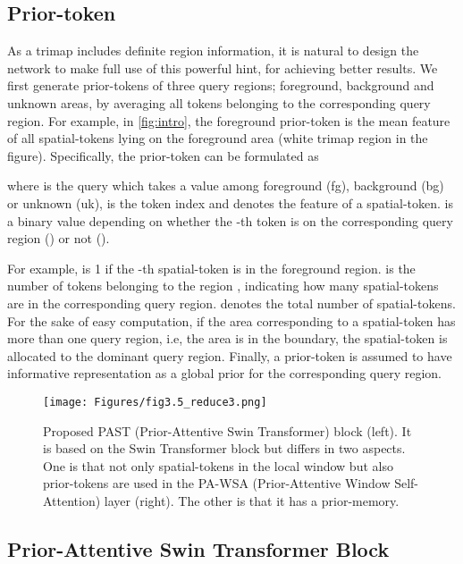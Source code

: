 \documentclass[10pt,twocolumn,letterpaper]{article}
\begin{document}
\subsection{Prior-token}
\label{sec:prior-token}
As a trimap includes definite region information, it is natural to design the network to make full use of this powerful hint, for achieving better results. We first generate prior-tokens of three query regions; foreground, background and unknown areas, by averaging all tokens belonging to the corresponding query region. For example, in \cref{fig:intro}, the foreground prior-token is the mean feature of all spatial-tokens lying on the foreground area (white trimap region in the figure).
Specifically, the prior-token  can be formulated as


where  is the query which takes a value among foreground (fg), background (bg) or unknown (uk),  is the token index and  denotes the feature of a spatial-token.  is a binary value depending on whether the -th token is on the corresponding query region () or not (). 

For example,  is 1 if the -th spatial-token is in the foreground region.  is the number of tokens belonging to the region , indicating how many spatial-tokens are in the corresponding query region.  denotes the total number of spatial-tokens.
For the sake of easy computation, if the area corresponding to a spatial-token has more than one query region, i.e, the area is in the boundary, the spatial-token is allocated to the dominant query region.
Finally, a prior-token  is assumed to have informative representation as a global prior for the corresponding query region.

\begin{figure}[t]
  \begin{center}
  \texttt{[image: Figures/fig3.5\_reduce3.png]}      
  \end{center}
  \vspace{-5mm}
  \caption{Proposed PAST (Prior-Attentive Swin Transformer) block (left). It is based on the Swin Transformer block but differs in two aspects. One is that not only spatial-tokens in the local window but also prior-tokens are used in the PA-WSA (Prior-Attentive Window Self-Attention) layer (right). The other is that it has a prior-memory.}
  \label{fig:PAST}
\end{figure}

\subsection{Prior-Attentive Swin Transformer Block}
\label{sec:PAST}
\end{document}
